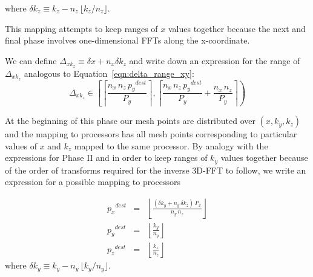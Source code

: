 \documentclass[pdftex,finalversion,simpleeqnnos,titlepage,12pt]{article}
\newcommand{\nodecount}{\ensuremath{P}}
\newcommand{\nodemeshsize}[1]{\ensuremath{\nodecount_{#1}}}
\newcommand{\nodecoord}[1]{\ensuremath{p_{#1}}}
\newcommand{\meshpernode}[1]{\ensuremath{n_{#1}}}
\newcommand{\offset}[2]{\ensuremath{\Delta_{#1#2}}}
\begin{document}
where $\delta k_z \equiv k_z-\meshpernode{z}\,\lfloor
k_z/\meshpernode{z}\rfloor$.

This mapping attempts to keep ranges of $x$ values together because
the next and final phase involves one-dimensional FFTs along the
x-coordinate.

We can define $\offset{x}{k_z} \equiv \delta x + \meshpernode{x}\delta
k_z$ and write down an expression for the range of $\offset{x}{k_z}$
analogous to Equation~\ref{eqn:delta_range_xy}:
\begin{equation}
\offset{x}{k_z} \in \left [ \left\lceil
  \frac{\meshpernode{x}\,\meshpernode{z} \,\nodecoord{y}^{dest}}{\nodemeshsize{y}}
  \right\rceil, \left\lceil
  \frac{\meshpernode{x}\,\meshpernode{z}\,\nodecoord{y}^{dest}}{\nodemeshsize{y}}
  + \frac{\meshpernode{x}\,\meshpernode{z}}{\nodemeshsize{y}}
  \right\rceil \right ) \label{eqn:delta_range_xkz}
\end{equation}


At the beginning of this phase our mesh points are distributed over
$(x, k_y, k_z)$ and the mapping to processors has all mesh points
corresponding to particular values of $x$ and $k_z$ mapped to the same
processor. By analogy with the expressions for Phase II and in order
to keep ranges of $k_y$ values together because of the order of
transforms required for the inverse 3D-FFT to follow, we write an
expression for a possible mapping to processors


\begin{eqnarray}
\nodecoord{x}^{dest} & = & \left\lfloor\frac{(\delta k_y + \meshpernode{y}\,\delta
  k_z ) \,\nodemeshsize{x} }{\meshpernode{y}\,\meshpernode{z}}
\right\rfloor \\ 
\nodecoord{y}^{dest} & = &
\left\lfloor\frac{k_y}{\meshpernode{y}}\right\rfloor \\
\nodecoord{z}^{dest} & = & \left\lfloor\frac{k_z}{\meshpernode{z}}\right\rfloor
\end{eqnarray}
where $\delta k_y \equiv k_y-\meshpernode{y}\,\lfloor
k_y/\meshpernode{y}\rfloor$.

\end{document}
